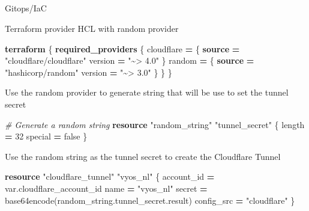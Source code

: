 \documentclass[
]{article}
\makeatletter
\let\oldsubparagraph\subparagraph
\renewcommand{\subparagraph}{
    \@ifstar
      \xxxSubParagraphStar
      \xxxSubParagraphNoStar
  }
\newcommand{\xxxSubParagraphStar}[1]{\oldsubparagraph*{#1}\mbox{}}
\newcommand{\xxxSubParagraphNoStar}[1]{\oldsubparagraph{#1}\mbox{}}
\newenvironment{Shaded}{\begin{snugshade}}{\end{snugshade}}
\newcommand{\BuiltInTok}[1]{#1}
\newcommand{\CommentTok}[1]{\textcolor[rgb]{0.56,0.35,0.01}{\textit{#1}}}
\newcommand{\DecValTok}[1]{\textcolor[rgb]{0.00,0.00,0.81}{#1}}
\newcommand{\KeywordTok}[1]{\textcolor[rgb]{0.13,0.29,0.53}{\textbf{#1}}}
\newcommand{\NormalTok}[1]{#1}
\newcommand{\OperatorTok}[1]{\textcolor[rgb]{0.81,0.36,0.00}{\textbf{#1}}}
\newcommand{\StringTok}[1]{\textcolor[rgb]{0.31,0.60,0.02}{#1}}
\newcommand{\VariableTok}[1]{\textcolor[rgb]{0.00,0.00,0.00}{#1}}
\makeatother
\begin{document}
\newpage{}

\subparagraph{Gitops/IaC}\label{gitopsiac-2}

Terraform provider HCL with random provider

\begin{Shaded}
\begin{Highlighting}[numbers=left,,]
\KeywordTok{terraform}\NormalTok{ \{}
  \KeywordTok{required\_providers}\NormalTok{ \{}
\NormalTok{    cloudflare }\OperatorTok{=}\NormalTok{ \{}
      \KeywordTok{source}  \OperatorTok{=} \StringTok{"cloudflare/cloudflare"}
\NormalTok{      version }\OperatorTok{=} \StringTok{"\textasciitilde{}\textgreater{} 4.0"}
\NormalTok{    \}}
\NormalTok{    random }\OperatorTok{=}\NormalTok{ \{}
      \KeywordTok{source}  \OperatorTok{=} \StringTok{"hashicorp/random"}
\NormalTok{      version }\OperatorTok{=} \StringTok{"\textasciitilde{}\textgreater{} 3.0"}
\NormalTok{    \}}
\NormalTok{  \}}
\NormalTok{\}}
\end{Highlighting}
\end{Shaded}

Use the random provider to generate string that will be use to set the
tunnel secret

\begin{Shaded}
\begin{Highlighting}[numbers=left,,]
\CommentTok{\# Generate a random string}
\KeywordTok{resource} \StringTok{"random\_string"} \StringTok{"tunnel\_secret"}\NormalTok{ \{}
  \BuiltInTok{length}  \OperatorTok{=} \DecValTok{32}
\NormalTok{  special }\OperatorTok{=} \VariableTok{false}
\NormalTok{\}}
\end{Highlighting}
\end{Shaded}

Use the random string as the tunnel secret to create the Cloudflare
Tunnel

\begin{Shaded}
\begin{Highlighting}[numbers=left,,]
\KeywordTok{resource} \StringTok{"cloudflare\_tunnel"} \StringTok{"vyos\_nl"}\NormalTok{ \{}
\NormalTok{  account\_id }\OperatorTok{=} \VariableTok{var}\NormalTok{.cloudflare\_account\_id}
\NormalTok{  name       }\OperatorTok{=} \StringTok{"vyos\_nl"}
\NormalTok{  secret     }\OperatorTok{=} \BuiltInTok{base64encode}\NormalTok{(random\_string.tunnel\_secret.result)}
\NormalTok{  config\_src }\OperatorTok{=} \StringTok{"cloudflare"}
\NormalTok{\}}
\end{Highlighting}
\end{Shaded}
\end{document}
